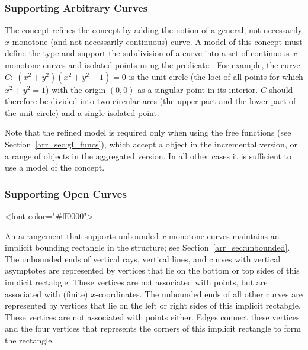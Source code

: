 \subsubsection{Supporting Arbitrary Curves
\label{arr_sssec:tr_full_concept}}

The concept  refines the
 concept by adding the notion
of a general, not necessarily $x$-monotone (and not necessarily
continuous) curve. A model of this concept must define the
 type and support the subdivision of a curve into a
set of continuous $x$-monotone curves and isolated points using
the predicate . For example, the curve
$C:\ (x^2 + y^2)(x^2 + y^2 - 1) = 0$ is the unit circle (the loci
of all points for which $x^2 + y^2  = 1$) with the origin $(0,0)$
as a singular point in its interior. $C$ should therefore be
divided into two circular arcs (the upper part and the lower part
of the unit circle) and a single isolated point.

Note that the refined model  is required
only when using the free  functions (see
Section~\ref{arr_sec:gl_funcs}), which accept a  object
in the incremental version, or a range of  objects in the
aggregated version. In all other cases it is sufficient to use a model
of the  concept.

\subsubsection{Supporting Open Curves}
%
\lcTex{\color{red}}
\begin{ccHtmlOnly}
<font color="#ff0000">
\end{ccHtmlOnly}
An arrangement that supports unbounded $x$-monotone curves maintains
an implicit bounding rectangle in the \dcel{} structure; see
Section~\ref{arr_sec:unbounded}. The unbounded ends of vertical rays, 
vertical lines, and curves with vertical asymptotes are represented
by vertices that lie on the bottom or top sides of this implicit
rectabgle. These vertices are not associated with points, but are
associated with (finite) $x$-coordinates. The unbounded ends of all
other curves are represented by vertices that lie on the left or
right sides of this implicit rectabgle. These vertices are not
associated with points either. Edges connect these vertices and the
four vertices that represents the corners of this implicit rectangle
to form the rectangle.

